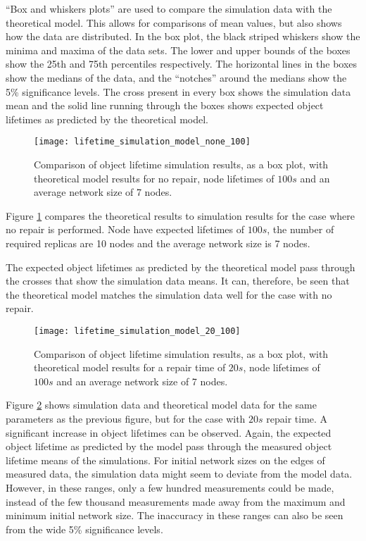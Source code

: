 ``Box and whiskers plots'' are used to compare the simulation data with the theoretical model. This allows for comparisons of mean values, but also shows how the data are distributed. In the box plot, the black striped whiskers show the minima and maxima of the data sets. The lower and upper bounds of the boxes show the 25th and 75th percentiles respectively. The horizontal lines in the boxes show the medians of the data, and the ``notches'' around the medians show the 5\% significance levels. The cross present in every box shows the simulation data mean and the solid line running through the boxes shows expected object lifetimes as predicted by the theoretical model.

\begin{figure}[htbp]
 \centering
 \texttt{[image: lifetime\_simulation\_model\_none\_100]}
 \caption{Comparison of object lifetime simulation results, as a box plot, with theoretical model results for no repair, node lifetimes of $100 s$ and an average network size of 7 nodes.}
 \label{fig_lifetime_simulation_model_none_100}
\end{figure}
%
Figure \ref{fig_lifetime_simulation_model_none_100} compares the theoretical results to simulation results for the case where no repair is performed. Node have expected lifetimes of $100 s$, the number of required replicas are 10 nodes and the average network size is 7 nodes.

The expected object lifetimes as predicted by the theoretical model pass through the crosses that show the simulation data means. It can, therefore, be seen that the theoretical model matches the simulation data well for the case with no repair.

\begin{figure}[htbp]
 \centering
 \texttt{[image: lifetime\_simulation\_model\_20\_100]}
 \caption{Comparison of object lifetime simulation results, as a box plot, with theoretical model results for a repair time of $20 s$, node lifetimes of $100 s$ and an average network size of 7 nodes.}
 \label{fig_lifetime_simulation_model_20_100}
\end{figure}
%
Figure \ref{fig_lifetime_simulation_model_20_100} shows simulation data and theoretical model data for the same parameters as the previous figure, but for the case with $20 s$ repair time. A significant increase in object lifetimes can be observed. Again, the expected object lifetime as predicted by the model pass through the measured object lifetime means of the simulations. For initial network sizes on the edges of measured data, the simulation data might seem to deviate from the model data. However, in these ranges, only a few hundred measurements could be made, instead of the few thousand measurements made away from the maximum and minimum initial network size. The inaccuracy in these ranges can also be seen from the wide 5\% significance levels.

